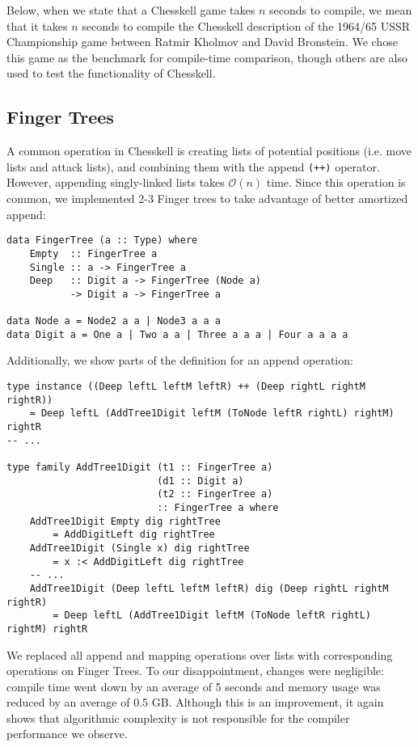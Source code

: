 \documentclass[12pt, a4paper, bibliography=totocnumbered]{scrreprt}
\newcommand{\inline}[1]{\lstinline[basicstyle=\ttfamily\footnotesize]{#1}}
\begin{document}
Below, when we state that a Chesskell game takes $n$ seconds to compile, we mean that it takes $n$ seconds to compile the Chesskell description of the 1964/65 USSR Championship game between Ratmir Kholmov and David Bronstein. We chose this game as the benchmark for compile-time comparison, though others are also used to test the functionality of Chesskell.

\subsection{Finger Trees}

A common operation in Chesskell is creating lists of potential positions (i.e. move lists and attack lists), and combining them with the append \inline{(++)} operator. However, appending singly-linked lists takes $\mathcal{O}(n)$ time. Since this operation is common, we implemented 2-3 Finger trees \cite{fingertrees} to take advantage of better amortized append:
\begin{lstlisting}
data FingerTree (a :: Type) where
    Empty  :: FingerTree a
    Single :: a -> FingerTree a
    Deep   :: Digit a -> FingerTree (Node a) 
           -> Digit a -> FingerTree a

data Node a = Node2 a a | Node3 a a a
data Digit a = One a | Two a a | Three a a a | Four a a a a
\end{lstlisting}

Additionally, we show parts of the definition for an append operation:

\begin{lstlisting}
type instance ((Deep leftL leftM leftR) ++ (Deep rightL rightM rightR))
    = Deep leftL (AddTree1Digit leftM (ToNode leftR rightL) rightM) rightR
-- ...

type family AddTree1Digit (t1 :: FingerTree a)
                          (d1 :: Digit a)
                          (t2 :: FingerTree a)
                          :: FingerTree a where
    AddTree1Digit Empty dig rightTree
        = AddDigitLeft dig rightTree
    AddTree1Digit (Single x) dig rightTree
        = x :< AddDigitLeft dig rightTree
    -- ...
    AddTree1Digit (Deep leftL leftM leftR) dig (Deep rightL rightM rightR)
        = Deep leftL (AddTree1Digit leftM (ToNode leftR rightL) rightM) rightR
\end{lstlisting}
We replaced all append and mapping operations over lists with corresponding operations on Finger Trees. To our disappointment, changes were negligible: compile time went down by an average of 5 seconds and memory usage was reduced by an average of 0.5 GB. Although this is an improvement, it again shows that algorithmic complexity is not responsible for the compiler performance we observe.
\end{document}
